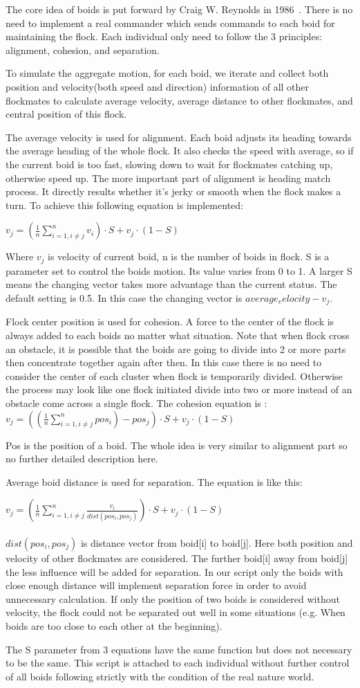 The core idea of boids is put forward by Craig W. Reynolds in 1986~\cite{Reynolds:1987}. There is no need to implement a real commander which sends commands to each boid for maintaining the flock. Each individual only need to follow the 3 principles: alignment, cohesion, and separation.

To simulate the aggregate motion, for each boid, we iterate and collect both position and velocity(both speed and direction) information of all other flockmates to calculate average velocity, average distance to other flockmates, and central position of this flock. 

The average velocity is used for alignment. Each boid adjusts its heading towards the average heading of the whole flock. It also checks the speed with average, so if the current boid is too fast, slowing down to wait for flockmates catching up, otherwise speed up. The more important part of alignment is heading match process. It directly results whether it’s jerky or smooth when the flock makes a turn. To achieve this following equation is implemented:

$v_j = (\frac{1}{n}\sum_{i=1,i\neq{j}}^{n}{v_i})\cdot S + v_j \cdot (1-S)$

Where $v_j$ is velocity of current boid, n is the number of boids in flock. S is a parameter set to control the boids motion. Its value varies from 0 to 1. A larger S means the changing vector takes more advantage than the current status. The default setting is 0.5. In this case the changing vector is $average_velocity - v_j$.

Flock center position is used for cohesion. A force to the center of the flock is always added to each boids no matter what situation. Note that when flock cross an obstacle, it is possible that the boids are going to divide into 2 or more parts then concentrate together again after then. In this case there is no need to consider the center of each cluster when flock is temporarily divided. Otherwise the process may look like one flock initiated divide into two or more instead of an obstacle come across a single flock. The cohesion equation is :
$v_j = ((\frac{1}{n}\sum_{i=1,i\neq{j}}^{n}{pos_i})-pos_j)\cdot S + v_j \cdot (1-S)$

Pos is the position of a boid. The whole idea is very similar to alignment part so no further detailed description here.

Average boid distance is used for separation. The equation is like this:

$v_j = (\frac{1}{n}\sum_{i=1,i\neq{j}}^{n}{\frac{v_i}{dist(pos_i,pos_j)}})\cdot S + v_j \cdot (1-S)$\\
\\
$dist(pos_i,pos_j)$ is distance vector from boid[i] to boid[j]. Here both position and velocity of other flockmates are considered. The further boid[i] away from boid[j] the less influence will be added for separation. In our script only the boids with close enough distance will implement separation force in order to avoid unnecessary calculation. If only the position of two boids is considered without velocity, the flock could not be separated out well in some situations (e.g. When boids are too close to each other at the beginning).

The S parameter from 3 equations have the same function but does not necessary to be the same. This script is attached to each individual without further control of all boids following strictly with the condition of the real nature world.